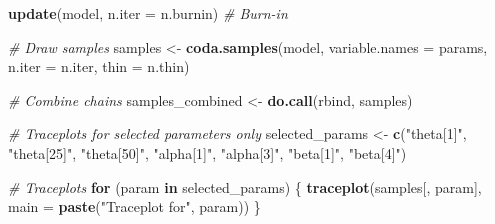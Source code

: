 \documentclass[
  11pt,
]{article}
\newenvironment{Shaded}{\begin{snugshade}}{\end{snugshade}}
\newcommand{\AttributeTok}[1]{\textcolor[rgb]{0.13,0.29,0.53}{#1}}
\newcommand{\CommentTok}[1]{\textcolor[rgb]{0.56,0.35,0.01}{\textit{#1}}}
\newcommand{\ControlFlowTok}[1]{\textcolor[rgb]{0.13,0.29,0.53}{\textbf{#1}}}
\newcommand{\FunctionTok}[1]{\textcolor[rgb]{0.13,0.29,0.53}{\textbf{#1}}}
\newcommand{\NormalTok}[1]{#1}
\newcommand{\OtherTok}[1]{\textcolor[rgb]{0.56,0.35,0.01}{#1}}
\newcommand{\StringTok}[1]{\textcolor[rgb]{0.31,0.60,0.02}{#1}}
\begin{document}
\begin{Shaded}
\begin{Highlighting}[]
\FunctionTok{update}\NormalTok{(model, }\AttributeTok{n.iter =}\NormalTok{ n.burnin)  }\CommentTok{\# Burn{-}in}

\CommentTok{\# Draw samples}
\NormalTok{samples }\OtherTok{\textless{}{-}} \FunctionTok{coda.samples}\NormalTok{(model,}
                        \AttributeTok{variable.names =}\NormalTok{ params,}
                        \AttributeTok{n.iter =}\NormalTok{ n.iter,}
                        \AttributeTok{thin =}\NormalTok{ n.thin)}

\CommentTok{\# Combine chains}
\NormalTok{samples\_combined }\OtherTok{\textless{}{-}} \FunctionTok{do.call}\NormalTok{(rbind, samples)}

\CommentTok{\# Traceplots for selected parameters only}
\NormalTok{selected\_params }\OtherTok{\textless{}{-}} \FunctionTok{c}\NormalTok{(}\StringTok{"theta[1]"}\NormalTok{, }\StringTok{"theta[25]"}\NormalTok{, }\StringTok{"theta[50]"}\NormalTok{, }\StringTok{"alpha[1]"}\NormalTok{, }\StringTok{"alpha[3]"}\NormalTok{, }\StringTok{"beta[1]"}\NormalTok{, }\StringTok{"beta[4]"}\NormalTok{)}

\CommentTok{\# Traceplots}
\ControlFlowTok{for}\NormalTok{ (param }\ControlFlowTok{in}\NormalTok{ selected\_params) \{}
  \FunctionTok{traceplot}\NormalTok{(samples[, param], }\AttributeTok{main =} \FunctionTok{paste}\NormalTok{(}\StringTok{"Traceplot for"}\NormalTok{, param))}
\NormalTok{\}}
\end{Highlighting}
\end{Shaded}
\end{document}

